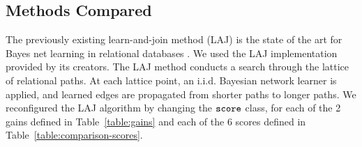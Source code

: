 \documentclass[letterpaper]{article}
\begin{document}
\begin{table} \centering
\caption{Datasets characteristics. \#Tuples = total number of tuples over all tables in the dataset. 
  \label{table:datasetsize}}
\end{table}


\subsection{Methods Compared}

The previously existing learn-and-join method (LAJ) is the state of the art for Bayes net learning in relational databases \cite{Schulte2012,Qian2014a}. We used the LAJ implementation provided by its creators. The LAJ method conducts a search through the lattice of relational paths. At each lattice point, an i.i.d. Bayesian network learner is applied, and learned edges are propagated from shorter paths to longer paths. We reconfigured the LAJ algorithm by changing the $\tt{score}$ class, for each of the 2 gains defined in Table~\ref{table:gains} and each of the 6 scores defined in Table~\ref{table:comparison-scores}.
\end{document}
